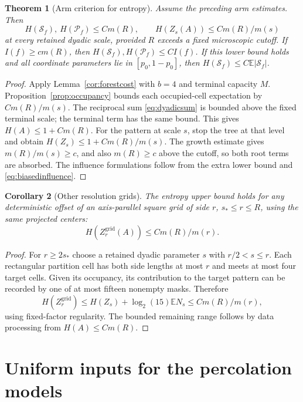 \documentclass[11pt]{amsart}
\newtheorem{theorem}{Theorem}[section]
\newtheorem{corollary}[theorem]{Corollary}
\theoremstyle{remark}
\newcommand{\E}{\mathbb E}
\newcommand{\cS}{\mathcal S}
\newcommand{\cP}{\mathcal P}
\begin{document}
\begin{theorem}[Arm criterion for entropy]\label{thm:armcriterion}
Assume the preceding arm estimates. Then
\begin{equation}\label{eq:armcriterion}
 H(\cS_f),\ H(\cP_f)\le C m(R),\qquad
 H(Z_s(A))\le C m(R)/m(s)
\end{equation}
at every retained dyadic scale, provided $R$ exceeds a fixed microscopic cutoff. If $I(f)\ge c m(R)$, then $H(\cS_f),H(\cP_f)\le CI(f)$. If this lower bound holds and all coordinate parameters lie in $[p_0,1-p_0]$, then $H(\cS_f)\le C\E|\cS_f|$.
\end{theorem}
\begin{proof}
Apply Lemma~\ref{cor:forestcost} with $b=4$ and terminal capacity $M$. Proposition~\ref{prop:occupancy} bounds each occupied-cell expectation by $Cm(R)/m(s)$. The reciprocal sum \eqref{eq:dyadicsum} is bounded above the fixed terminal scale; the terminal term has the same bound. This gives $H(A)\le1+Cm(R)$. For the pattern at scale $s$, stop the tree at that level and obtain $H(Z_s)\le1+Cm(R)/m(s)$. The growth estimate gives $m(R)/m(s)\ge c$, and also $m(R)\ge c$ above the cutoff, so both root terms are absorbed. The influence formulations follow from the extra lower bound and \eqref{eq:biasedinfluence}.
\end{proof}

\begin{corollary}[Other resolution grids]\label{cor:grids}
The entropy upper bound holds for any deterministic offset of an axis-parallel square grid of side $r$, $s_*\le r\le R$, using the same projected centers:
\[
 H(Z_r^{\mathrm{grid}}(A))\le C m(R)/m(r).
\]
\end{corollary}
\begin{proof}
For $r\ge2s_*$ choose a retained dyadic parameter $s$ with $r/2<s\le r$. Each rectangular partition cell has both side lengths at most $r$ and meets at most four target cells. Given its occupancy, its contribution to the target pattern can be recorded by one of at most fifteen nonempty masks. Therefore
\[
 H(Z_r^{\mathrm{grid}})\le H(Z_s)+\log_2(15)\E N_s
 \le C m(R)/m(r),
\]
using fixed-factor regularity. The bounded remaining range follows by data processing from $H(A)\le Cm(R)$.
\end{proof}

\section{Uniform inputs for the percolation models}\label{sec:inputs}
\end{document}
